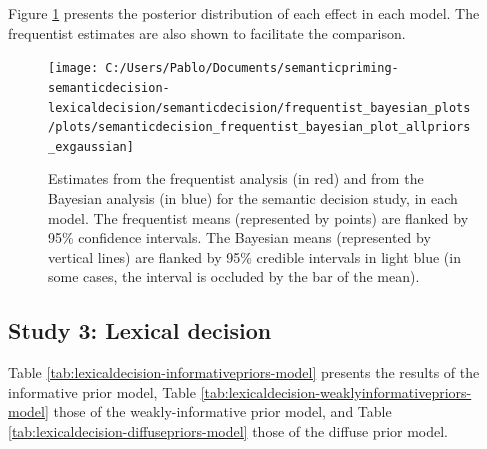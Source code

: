 \documentclass[
  12pt,
  man,floatsintext]{apa7}
\begin{document}
\clearpage

Figure \ref{fig:semanticdecision-frequentist-bayesian-plot-allpriors-exgaussian} presents the posterior distribution of each effect in each model. The frequentist estimates are also shown to facilitate the comparison.

\begin{figure}

{\centering \texttt{[image: C:/Users/Pablo/Documents/semanticpriming-semanticdecision-lexicaldecision/semanticdecision/frequentist\_bayesian\_plots/plots/semanticdecision\_frequentist\_bayesian\_plot\_allpriors\_exgaussian]} 

}

\caption{Estimates from the frequentist analysis (in red) and from the Bayesian analysis (in blue) for the semantic decision study, in each model. The frequentist means (represented by points) are flanked by 95\% confidence intervals. The Bayesian means (represented by vertical lines) are flanked by 95\% credible intervals in light blue (in some cases, the interval is occluded by the bar of the mean).}\label{fig:semanticdecision-frequentist-bayesian-plot-allpriors-exgaussian}
\end{figure}

\clearpage

\hypertarget{study-3-lexical-decision-4}{%
\subsection{Study 3: Lexical decision}\label{study-3-lexical-decision-4}}

Table \ref{tab:lexicaldecision-informativepriors-model} presents the results of the informative prior model, Table \ref{tab:lexicaldecision-weaklyinformativepriors-model} those of the weakly-informative prior model, and Table \ref{tab:lexicaldecision-diffusepriors-model} those of the diffuse prior model.
\end{document}
